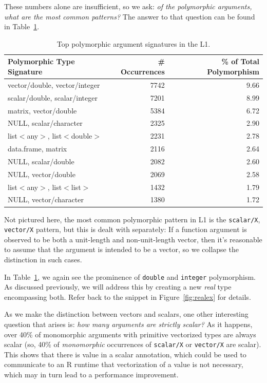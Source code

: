 \documentclass[acmsmall,10pt,review,anonymous]{acmart}\settopmatter{printfolios=true,printccs=false,printacmref=false}
\begin{document}
These numbers alone are insufficient, so we ask: {\it of the polymorphic arguments, what are the most common patterns?}
The answer to that question can be found in Table~\ref{tab:toppolyL1}.

\begin{table}[ht]
\label{tab:toppolyL1}
\centering
\begin{tabular}{lrr}
  \hline
 Polymorphic Type Signature & \# Occurrences & \% of Total Polymorphism \\ 
  \hline
  vector/double, vector/integer & 7742 & 9.66 \\ 
  scalar/double, scalar/integer & 7201 & 8.99 \\ 
  matrix, vector/double & 5384 & 6.72 \\ 
  NULL, scalar/character & 2325 & 2.90 \\ 
  list$<$any$>$, list$<$double$>$ & 2231 & 2.78 \\ 
  data.frame, matrix & 2116 & 2.64 \\ 
  NULL, scalar/double & 2082 & 2.60 \\ 
  NULL, vector/double & 2069 & 2.58 \\ 
  list$<$any$>$, list$<$list$>$ & 1432 & 1.79 \\ 
  NULL, vector/character & 1380 & 1.72 \\
     \hline
\end{tabular}
\caption{Top polymorphic argument signatures in the L1.}
\end{table}

Not pictured here, the most common polymorphic pattern in L1 is the {\tt scalar/X}, {\tt vector/X} pattern, but this is dealt with separately:
If a function argument is observed to be both a unit-length and non-unit-length vector, then it's reasonable to assume that the argument is intended to be a vector, so we collapse the distinction in such cases.

In Table~\ref{tab:toppolyL1}, we again see the prominence of {\tt double} and {\tt integer} polymorphism.
As discussed previously, we will address this by creating a new {\it real} type encompassing both.
Refer back to the snippet in Figure~\ref{fig:realex} for details.

As we make the distinction between vectors and scalars, one other interesting question that arises is: {\it how many arguments are strictly scalar?}
As it happens, over 40\% of monomorphic arguments with primitive vectorized types are always scalar (so, 40\% of {\it monomorphic} occurrences of {\tt scalar/X} or {\tt vector/X} are scalar).
This shows that there is value in a scalar annotation, which could be used to communicate to an R runtime that vectorization of a value is not necessary, which may in turn lead to a performance improvement.
\end{document}
